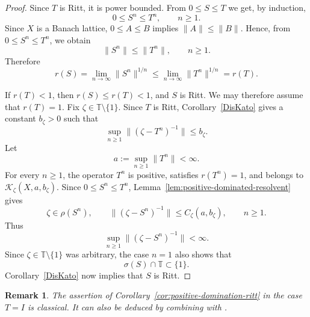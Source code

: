 \documentclass[11pt]{amsart}
\numberwithin{equation}{section}
\newtheorem{remark}[theorem]{Remark}
\theoremstyle{definition}
\theoremstyle{plain}
\def\T{\mathbb{T}}
\begin{document}
\begin{proof}
Since $T$ is %
Ritt, it is power bounded. From $0\le S\le T$ %
we get, by induction,
\[
   0\le S^n\le T^n,
   \qquad n\ge1.
\]
Since $X$ is a Banach lattice, \(0\le A\le B\) implies
\(\|A\|\le\|B\|\). Hence, from \(0\le S^n\le T^n\), we obtain
\[
        \|S^n\|\le \|T^n\|,\qquad n\ge1.
\]
Therefore
\[
        r(S)=\lim_{n\to\infty}\|S^n\|^{1/n}
        \le
        \lim_{n\to\infty}\|T^n\|^{1/n}
        =r(T).
\]

If $r(T)<1$, then $r(S)\le r(T)<1$, and $S$ is Ritt. We may therefore assume that
$r(T)=1$. Fix $\zeta\in\T\setminus\{1\}$. Since $T$ is Ritt, Corollary~\ref{DisKato} gives a constant
$b_\zeta>0$ such that
\[
   \sup_{n\ge1}\|(\zeta -T^n)^{-1}\|\le b_\zeta .
\]
Let
\[
   a:=\sup_{n\ge1}\|T^n\|<\infty .
\]
For every $n\ge1$, the operator $T^n$ is positive, satisfies
$r(T^n)=1$, and belongs to $\mathcal K_\zeta(X,a,b_\zeta)$. 
Since
\(0\le S^n\le T^n\), Lemma~\ref{lem:positive-dominated-resolvent} gives
\[
   \zeta\in\rho(S^n),
   \qquad
   \|(\zeta-S^n)^{-1}\|
   \le C_\zeta(a,b_\zeta),
   \qquad n\ge1.
\]
Thus
\[
   \sup_{n\ge1}\|(\zeta -S^n)^{-1}\|<\infty .
\]
Since \(\zeta\in\mathbb T\setminus\{1\}\) was arbitrary, the case
\(n=1\) also shows that
\[
   \sigma(S)\cap\mathbb T\subset\{1\}.
\]
Corollary~\ref{DisKato} now implies that $S$ is Ritt.
\end{proof}


\begin{remark}
The assertion of Corollary~\ref{cor:positive-domination-ritt} in the case $T=I$ is classical.  It can also be deduced by combining \cite[Theorem~1.5]{Dungey} with \cite[Theorem~1]{Gluck}.
\end{remark}
\end{document}
